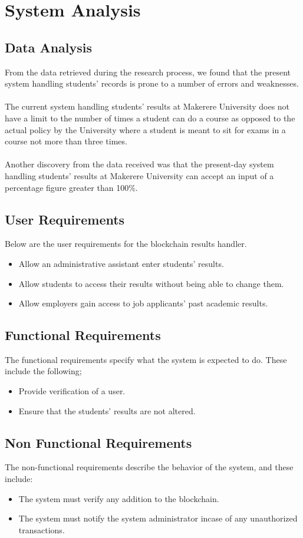 \newpage
\section{System Analysis}
\subsection{Data Analysis}
From the data retrieved during the research process, we found that the present system handling students’ records is prone to a number of errors and weaknesses.\\~\\
The current system handling students’ results at Makerere University does not have a limit to the number of times a student can do a course as opposed to the actual policy by the University where a student is meant to sit for exams in a course not more than three times.\\~\\
Another discovery from the data received was that the present-day system handling students’ results at Makerere University can accept an input of a percentage figure greater than 100\%.

\subsection{User Requirements}
Below are the user requirements for the blockchain results handler.
\begin{itemize}
\item Allow an administrative assistant enter students’ results.
\item Allow students to access their results without being able to change them.
\item Allow employers gain access to job applicants' past academic results. 
\end{itemize}

\subsection{Functional Requirements}
The functional requirements specify what the system is expected to do. These include the following;
\begin{itemize}
\item Provide verification of a user.
\item Ensure that the students’ results are not altered.
\end{itemize}


\subsection{Non Functional Requirements}
The non-functional requirements describe the behavior of the system, and these include:
\begin{itemize}
\item The system must verify any addition to the blockchain.
\item The system must notify the system administrator incase of any unauthorized transactions.
\end{itemize}
